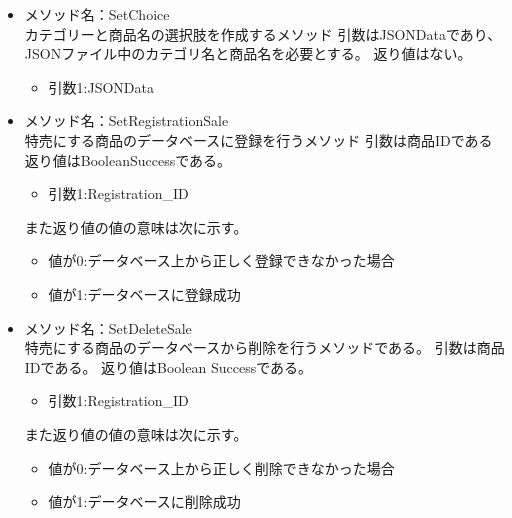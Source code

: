 \documentclass[a4j]{jarticle}
\begin{document}
\begin{itemize}
\item メソッド名：SetChoice\\

カテゴリーと商品名の選択肢を作成するメソッド
引数はJSONDataであり、JSONファイル中のカテゴリ名と商品名を必要とする。
返り値はない。
	\begin{itemize}
		\item 引数1:JSONData
	\end{itemize}
	
\item メソッド名：SetRegistrationSale\\

特売にする商品のデータベースに登録を行うメソッド
引数は商品IDである%
返り値はBooleanSuccessである。

	\begin{itemize}
		\item 引数1:Registration\_ID
	\end{itemize}
また返り値の値の意味は次に示す。
	\begin{itemize}
		\item 値が0:データベース上から正しく登録できなかった場合
		\item 値が1:データベースに登録成功
	\end{itemize}
\item メソッド名：SetDeleteSale\\
特売にする商品のデータベースから削除を行うメソッドである。
引数は商品IDである。
返り値はBoolean Successである。

	\begin{itemize}
		\item 引数1:Registration\_ID
	\end{itemize}
また返り値の値の意味は次に示す。
	\begin{itemize}
		\item 値が0:データベース上から正しく削除できなかった場合
		\item 値が1:データベースに削除成功
	\end{itemize}

\end{itemize}
\end{document}
